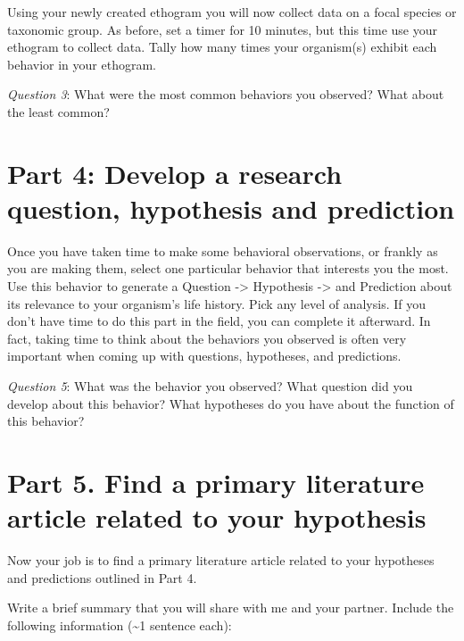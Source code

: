 \documentclass[]{book}
\begin{document}
Using your newly created ethogram you will now collect data on a focal species or taxonomic group. As before, set a timer for 10 minutes, but this time use your ethogram to collect data. Tally how many times your organism(s) exhibit each behavior in your ethogram.

\emph{Question 3}: What were the most common behaviors you observed? What about the least common?

\hypertarget{part-4-develop-a-research-question-hypothesis-and-prediction}{%
\section*{Part 4: Develop a research question, hypothesis and prediction}\label{part-4-develop-a-research-question-hypothesis-and-prediction}}

Once you have taken time to make some behavioral observations, or frankly as you are making them, select one particular behavior that interests you the most. Use this behavior to generate a Question -\textgreater{} Hypothesis -\textgreater{} and Prediction about its relevance to your organism's life history. Pick any level of analysis. If you don't have time to do this part in the field, you can complete it afterward. In fact, taking time to think about the behaviors you observed is often very important when coming up with questions, hypotheses, and predictions.

\emph{Question 5}: What was the behavior you observed? What question did you develop about this behavior? What hypotheses do you have about the function of this behavior?

\hypertarget{part-5.-find-a-primary-literature-article-related-to-your-hypothesis}{%
\section*{Part 5. Find a primary literature article related to your hypothesis}\label{part-5.-find-a-primary-literature-article-related-to-your-hypothesis}}

Now your job is to find a primary literature article related to your hypotheses and predictions outlined in Part 4.

Write a brief summary that you will share with me and your partner. Include the following information (\textasciitilde{}1 sentence each):
\end{document}
